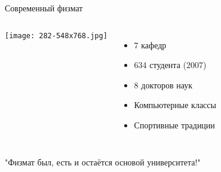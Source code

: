 \documentclass[12pt]{beamer}
\begin{document}
\begin{frame}{Современный физмат}
    \begin{columns}
        \texttt{[image: 282-548x768.jpg]}
        
        \begin{itemize}
            \item 7 кафедр
            \item 634 студента (2007)
            \item 8 докторов наук
            \item Компьютерные классы
            \item Спортивные традиции
        \end{itemize}
    \end{columns}
    
    \vspace{0.5cm}
    \centering
    \begin{block}{}
        "Физмат был, есть и остаётся основой университета!"
    \end{block}
\end{frame}
\end{document}
